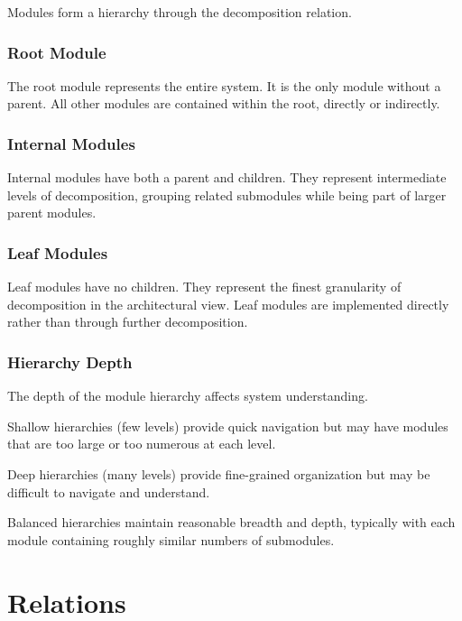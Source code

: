 \documentclass[11pt]{article}
\begin{document}
Modules form a hierarchy through the decomposition relation.

\subsubsection{Root Module}

The root module represents the entire system. It is the only module without a parent. All other modules are contained within the root, directly or indirectly.

\subsubsection{Internal Modules}

Internal modules have both a parent and children. They represent intermediate levels of decomposition, grouping related submodules while being part of larger parent modules.

\subsubsection{Leaf Modules}

Leaf modules have no children. They represent the finest granularity of decomposition in the architectural view. Leaf modules are implemented directly rather than through further decomposition.

\subsubsection{Hierarchy Depth}

The depth of the module hierarchy affects system understanding.

Shallow hierarchies (few levels) provide quick navigation but may have modules that are too large or too numerous at each level.

Deep hierarchies (many levels) provide fine-grained organization but may be difficult to navigate and understand.

Balanced hierarchies maintain reasonable breadth and depth, typically with each module containing roughly similar numbers of submodules.

\section{Relations}
\end{document}

